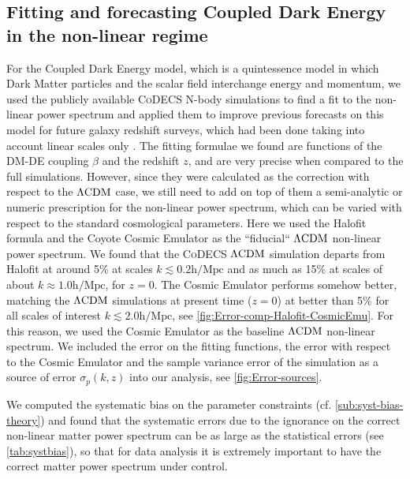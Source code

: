  
\subsection*{Fitting and forecasting Coupled Dark Energy in the non-linear regime}


For the Coupled Dark Energy model, which is a quintessence model in which Dark Matter particles and the scalar field interchange
energy and momentum, we used the publicly available \textsc{CoDECS} N-body simulations  
to find a fit to the non-linear power spectrum and
applied them to improve previous forecasts on this model for future galaxy redshift surveys, which had been done taking
into account linear scales only .
The fitting formulae we found are functions of the DM-DE coupling $\beta$ and the redshift $z$, and are very precise when compared to the  full simulations.
However, since they were calculated as the correction with respect to the $\Lambda\mathrm{CDM}$ case, 
we still need to add on top of them a semi-analytic or numeric prescription for the non-linear power spectrum, which
can be varied with respect to the standard cosmological parameters.
Here we used the Halofit formula and the Coyote Cosmic Emulator as the ``fiducial`` $\Lambda\mathrm{CDM}$ non-linear power spectrum. 
We found that the \textsc{CoDECS} $\Lambda\mathrm{CDM}$ simulation departs from Halofit at around 5\% 
at scales $k \lesssim 0.2 \mathrm{h/Mpc}$ and as much as 15\% at scales of about $k \approx 1.0 \mathrm{h/Mpc}$, for $z=0$.
The Cosmic Emulator performs somehow better, matching the $\Lambda\mathrm{CDM}$ simulations at present time ($z=0$) at better than 5\%
for all scales of interest $k \lesssim 2.0 \mathrm{h/Mpc}$, see \cref{fig:Error-comp-Halofit-CosmicEmu}. 
For this reason, we used the Cosmic Emulator as the baseline $\Lambda\mathrm{CDM}$ non-linear spectrum.
We included the error on the fitting functions, the error with respect to the Cosmic Emulator and the sample variance error
of the simulation as a source of error $\sigma_p(k,z)$ into our analysis, see \cref{fig:Error-sources}.

We computed the systematic bias on the parameter constraints (cf. \cref{sub:syst-bias-theory}) and 
found that the systematic errors due to the ignorance on the correct non-linear matter power spectrum can be as large as the statistical errors
(see \cref{tab:systbias}),
so that for data analysis it is extremely important to have the correct matter power spectrum under control.

